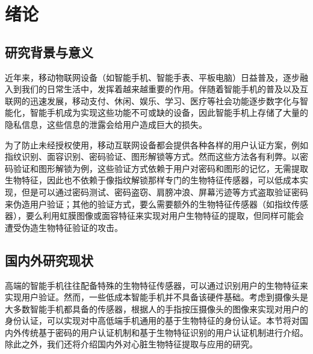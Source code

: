 %
%
%
%
%
%

\chapter{绪论}


\section{研究背景与意义}
{近年来，移动物联网设备（如智能手机、智能手表、平板电脑）日益普及，逐步融入到我们的日常生活中，发挥着越来越重要的作用。伴随着智能手机的普及以及互联网的迅速发展，移动支付、休闲、娱乐、学习、医疗等社会功能逐步数字化与智能化，智能手机成为实现这些功能不可或缺的设备，因此智能手机上存储了大量的隐私信息，这些信息的泄露会给用户造成巨大的损失。}
\par
{为了防止未经授权使用，移动互联网设备都会提供各种各样的用户认证方案，例如指纹识别、面容识别、密码验证、图形解锁\cite{2021Enabling,1981Password,2005Authentication}等方式。然而这些方法各有利弊。以密码验证和图形解锁为例，这些验证方式依赖于用户对密码和图形的记忆，无需提取生物特征，因此也不依赖于像指纹解锁那样专门的生物特征传感器，可以低成本实现，但是可以通过密码测试、密码盗窃、肩膀冲浪\cite{2014Shoulder}、屏幕污迹等方式盗取验证密码来伪造用户验证；其他的验证方式，要么需要额外的生物特征传感器（如指纹传感器），要么利用虹膜图像或面容特征来实现对用户生物特征的提取，但同样可能会遭受伪造生物特征验证的攻击\cite{2011How}。
			}
		
\section{国内外研究现状}
{高端的智能手机往往配备特殊的生物特征传感器，可以通过识别用户的生物特征来实现用户验证。然而，一些低成本智能手机并不具备该硬件基础。考虑到摄像头是大多数智能手机都具备的传感器，根据人的手指按压摄像头的图像来实现对用户的身份认证，可以实现对中高低端手机通用的基于生物特征的身份认证。本节将对国内外传统基于密码的用户认证机制和基于生物特征识别的用户认证机制进行介绍。除此之外，我们还将介绍国内外对心脏生物特征提取与应用的研究。}
